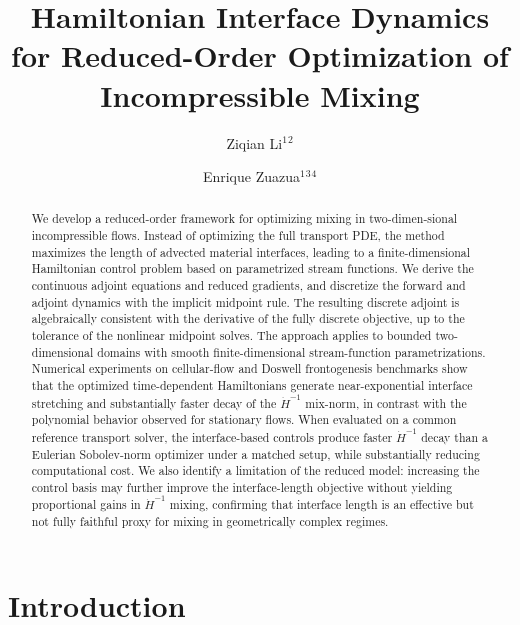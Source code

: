 \documentclass[12pt, reqno]{amsart}
\title[]{Hamiltonian Interface Dynamics for Reduced-Order Optimization of Incompressible Mixing}
\author{Ziqian Li$^1$$^2$}
\author{Enrique Zuazua$^1$$^3$$^4$}
\theoremstyle{plain}
\theoremstyle{definition}
\numberwithin{equation}{section}
\numberwithin{figure}{section}
\numberwithin{algorithm}{section}
\begin{document}


\begin{abstract}
We develop a reduced-order framework for optimizing mixing in two-dimen-sional incompressible flows. Instead of optimizing the full transport PDE, the method maximizes the length of advected material interfaces, leading to a finite-dimensional Hamiltonian control problem based on parametrized stream functions. We derive the continuous adjoint equations and reduced gradients, and discretize the forward and adjoint dynamics with the implicit midpoint rule. The resulting discrete adjoint is algebraically consistent with the derivative of the fully discrete objective, up to the tolerance of the nonlinear midpoint solves. The approach applies to bounded two-dimensional domains with smooth finite-dimensional stream-function parametrizations. Numerical experiments on cellular-flow and Doswell frontogenesis benchmarks show that the optimized time-dependent Hamiltonians generate near-exponential interface stretching and substantially faster decay of the $\dot{H}^{-1}$ mix-norm, in contrast with the polynomial behavior observed for stationary flows. When evaluated on a common reference transport solver, the interface-based controls produce faster $\dot{H}^{-1}$ decay than a Eulerian Sobolev-norm optimizer under a matched setup, while substantially reducing computational cost. We also identify a limitation of the reduced model: increasing the control basis may further improve the interface-length objective without yielding proportional gains in $\dot{H}^{-1}$ mixing, confirming that interface length is an effective but not fully faithful proxy for mixing in geometrically complex regimes.
\end{abstract}

\maketitle

\section{Introduction}
\end{document}
